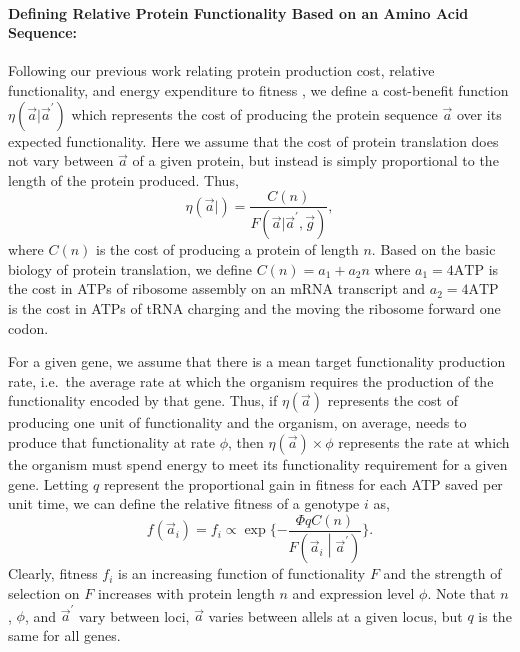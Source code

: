 \documentclass[13pt]{article}
\newcommand{\avec}{\ensuremath{\vec{a}}\xspace}
\newcommand{\avecopt}{\ensuremath{\vec{a}^\prime}\xspace}
\begin{document}
\paragraph*{Defining Relative Protein Functionality Based on an Amino Acid Sequence:} 
Following our previous work relating protein production cost, relative functionality, and energy expenditure to fitness \cite{Gilchrist2007,ShahAndGilchrist11}, we define a cost-benefit function $\eta(\avec|\avecopt)$ which represents the cost of producing the protein sequence \avec over its expected functionality.
Here we assume that the cost of protein translation does not vary between \avec of a given protein, but instead is simply proportional to the length of the protein produced.
Thus,
\begin{equation}
\label{eq:etadef}
\eta\left(\avec |\right) = \frac{C(n)}{F\left(\vec{a} | \avecopt,\vec{g}\right)},
\end{equation}
where $C(n)$ is the cost of producing a protein of length $n$.
Based on the basic biology of protein translation, we define $C(n) = a_1 + a_2 n $ where  $a_1 = 4 \text{ATP}$ is the cost in ATPs of ribosome assembly on an mRNA transcript and $a_2 = 4 \text{ATP}$ is the cost in ATPs of tRNA charging and the moving the ribosome forward one codon.

For a given gene, we assume that there is a mean target functionality production rate, i.e.~the average rate at which the organism requires the production of the functionality encoded by that gene.
Thus, if $\eta(\avec)$ represents the cost of producing one unit of functionality and the organism, on average, needs to produce that functionality at rate $\phi$, then $\eta(\avec) \times \phi$ represents the rate at which the organism must spend energy to meet its functionality requirement for a given gene.
Letting $q$ represent the proportional gain in fitness for each ATP saved per unit time, we can define the relative fitness of a genotype $i$ as,
\[
f(\avec_i) = f_i  \propto \exp\{-\frac{\Phi q C(n)}{F\left(\avec_i\middle|\avecopt\right)}\}.
\]
Clearly, fitness $f_i$ is an increasing function of functionality $F$ and the strength of selection on $F$ increases with protein length $n$ and expression level $\phi$.
Note that $n$, $\phi$, and \avecopt vary between loci, \avec varies between allels at a given locus, but $q$ is the same for all genes.
\end{document}
